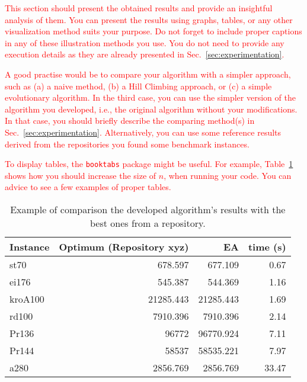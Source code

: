 \textcolor{red}{This section should present the obtained results and provide an insightful analysis of them. You can present the results using graphs, tables, or any other visualization method suits your purpose. Do not forget to include proper captions \cite{zobel2014graphs} in any of these illustration methods you use. You do not need to provide any execution details as they are already presented in Sec.~\ref{sec:experimentation}.}

\textcolor{red}{A good practise would be to compare your algorithm with a simpler approach, such as (a) a naive method, (b) a Hill Climbing approach, or (c) a simple evolutionary algorithm. In the third case, you can use the simpler version of the algorithm you developed, i.e., the original algorithm without your modifications. In that case, you should briefly describe the comparing method(s) in Sec.~\ref{sec:experimentation}. Alternatively, you can use some reference results derived from the repositories you found some benchmark instances.}

\textcolor{red}{To display tables, the \texttt{booktabs} package might be useful. For example, Table~\ref{tab:results_example} shows how you should increase the  size of $n$, when running your code. You can advice \cite{zobel2014graphs} to see a few examples of proper tables.}

\begin{table}[h]
	\centering
	\caption{Example of comparison the developed algorithm's results with the best ones from a repository.}
	\label{tab:results_example}
	\begin{tabular}{lrrr}
		\toprule
		\textbf{Instance} & \textbf{Optimum (Repository xyz)} & \textbf{EA} & \textbf{time (s)} \\
		\midrule
		st70              & 678.597                           & 677.109     & 0.67              \\
		ei176             & 545.387                           & 544.369     & 1.16              \\
		kroA100           & 21285.443                         & 21285.443   & 1.69              \\
		rd100             & 7910.396                          & 7910.396    & 2.14              \\
		Pr136             & 96772                             & 96770.924   & 7.11              \\
		Pr144             & 58537                             & 58535.221   & 7.97              \\
		a280              & 2856.769                          & 2856.769    & 33.47             \\
		\bottomrule
	\end{tabular}
\end{table}

